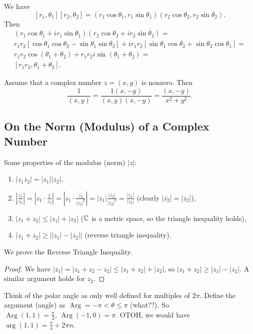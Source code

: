 \begin{example}
   We have \[
       [r_1,\theta_1][r_2,\theta_2]=(r_1\cos\theta_1,r_1\sin\theta_1)(r_2\cos\theta_2,r_2\sin\theta_2).
   \]
   Then 
   \begin{gather*}
       (r_1\cos\theta_1+i r_1\sin\theta_1)(r_2\cos\theta_2+i r_2\sin\theta_2) = \\ 
       r_1r_2\left[ \cos\theta_1\cos\theta_2-\sin\theta_1\sin\theta_2 \right] + ir_1r_2\left[ \sin\theta_1\cos\theta_2 + \sin\theta_2\cos\theta_1 \right]=\\
       r_1r_2\cos(\theta_1+\theta_2)+r_1r_2i\sin(\theta_1+\theta_2)=\\
       [r_1r_2,\theta_1+\theta_2].
   \end{gather*}
\end{example}
\begin{example}
    Assume that a complex number $z=(x,y)$ is nonzero. Then \[
        \frac{1}{(x,y)}=\frac{1(x,-y)}{(x,y)(x,-y)}=\frac{(x,-y)}{x^2+y^2}.
    \]
\end{example}
\subsection{On the Norm (Modulus) of a Complex Number}
\begin{example}
Some properties of the modulus (norm) $|z|$: 
\begin{enumerate}
    \item $|z_1z_2|=|z_1| |z_2|$,
    \item $\left| \frac{z_1}{z_2} \right| = \left| z_1\cdot \frac{1}{z_2} \right| = \left| z_1\cdot \frac{\bar{z_2}}{|z_2|^2} \right| = |z_1|\frac{\left| z_2 \right| }{\left| z_2 \right| ^2}= \frac{\left| z_1 \right| }{\left| z_2 \right| }$ (clearly $|\bar{z_2}|=|z_2|$),
    \item $|z_1+z_2| \leq |z_1|+|z_2|$ ($\mathbb{C}$ is a metric space, so the triangle inequality holds),
    \item $|z_1+z_2| \geq \big| |z_1|-|z_2| \big| $ (reverse triangle inequality).
\end{enumerate}
\end{example}
We prove the Reverse Triangle Inequality.
\begin{proof}
    We have $|z_1|=|z_1+z_2-z_2| \leq |z_1+z_2|+|z_2|$, so $|z_1+z_2|\geq|z_1|-|z_2|$. A similar argument holds for $z_2$.
\end{proof}
Think of the polar angle as only well defined for multiples of $2\pi$. Define the argument (angle) as $\operatorname{Arg} = -\pi < \theta \leq \pi$ (what??). So $\operatorname{Arg}(1,1)=\frac{\pi}{4}, \, \operatorname{Arg}(-1,0)=\pi$. OTOH, we would have $\operatorname{arg}(1,1) = \frac{\pi}{4}+2\pi n$.
